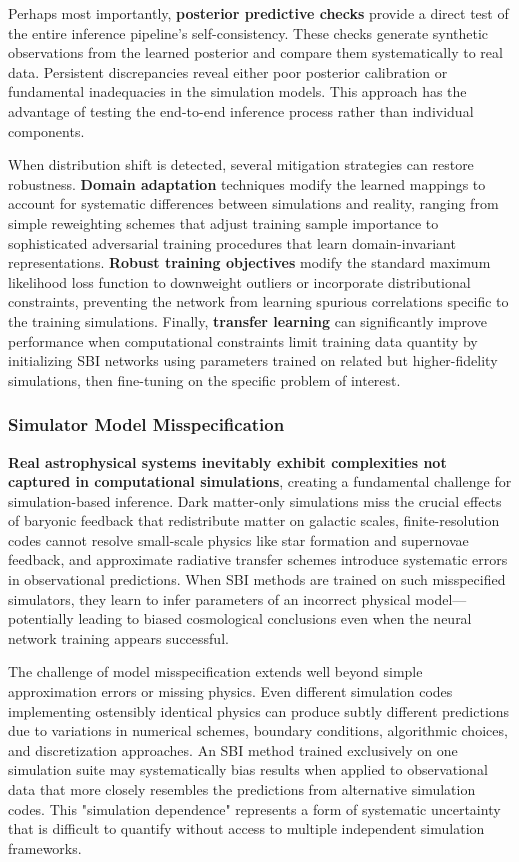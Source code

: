 \documentclass{SciPost}
\begin{document}
Perhaps most importantly, \textbf{posterior predictive checks} provide a direct test of the entire inference pipeline's self-consistency. These checks generate synthetic observations from the learned posterior and compare them systematically to real data. Persistent discrepancies reveal either poor posterior calibration or fundamental inadequacies in the simulation models. This approach has the advantage of testing the end-to-end inference process rather than individual components.

When distribution shift is detected, several mitigation strategies can restore robustness. \textbf{Domain adaptation} techniques modify the learned mappings to account for systematic differences between simulations and reality, ranging from simple reweighting schemes that adjust training sample importance to sophisticated adversarial training procedures that learn domain-invariant representations. \textbf{Robust training objectives} modify the standard maximum likelihood loss function to downweight outliers or incorporate distributional constraints, preventing the network from learning spurious correlations specific to the training simulations. Finally, \textbf{transfer learning} can significantly improve performance when computational constraints limit training data quantity by initializing SBI networks using parameters trained on related but higher-fidelity simulations, then fine-tuning on the specific problem of interest.

\subsubsection{Simulator Model Misspecification}

\textbf{Real astrophysical systems inevitably exhibit complexities not captured in computational simulations}, creating a fundamental challenge for simulation-based inference. Dark matter-only simulations miss the crucial effects of baryonic feedback that redistribute matter on galactic scales, finite-resolution codes cannot resolve small-scale physics like star formation and supernovae feedback, and approximate radiative transfer schemes introduce systematic errors in observational predictions. When SBI methods are trained on such misspecified simulators, they learn to infer parameters of an incorrect physical model—potentially leading to biased cosmological conclusions even when the neural network training appears successful.

The challenge of model misspecification extends well beyond simple approximation errors or missing physics. Even different simulation codes implementing ostensibly identical physics can produce subtly different predictions due to variations in numerical schemes, boundary conditions, algorithmic choices, and discretization approaches. An SBI method trained exclusively on one simulation suite may systematically bias results when applied to observational data that more closely resembles the predictions from alternative simulation codes. This "simulation dependence" represents a form of systematic uncertainty that is difficult to quantify without access to multiple independent simulation frameworks.
\end{document}
